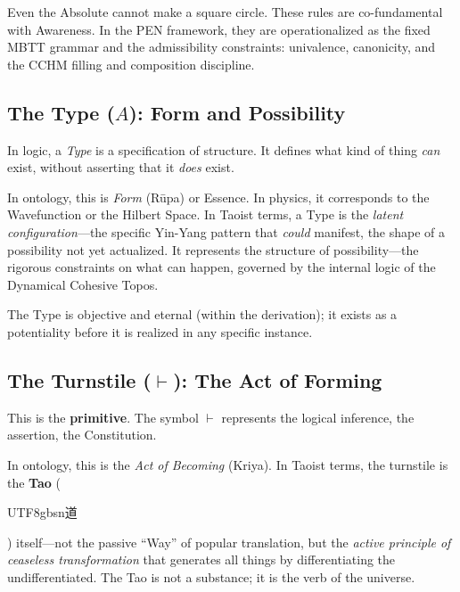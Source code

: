 \documentclass[12pt,a4paper]{article}
\newcommand{\turnstile}{\vdash}
\begin{document}
Even the Absolute cannot make a square circle. These rules are co-fundamental with Awareness. In the PEN framework, they are operationalized as the fixed MBTT grammar and the admissibility constraints: univalence, canonicity, and the CCHM filling and composition discipline.


\subsection{The Type ($A$): Form and Possibility}
\label{sec:type}

In logic, a \emph{Type} is a specification of structure. It defines what kind of thing \emph{can} exist, without asserting that it \emph{does} exist.

In ontology, this is \emph{Form} (R\=upa) or Essence. In physics, it corresponds to the Wavefunction or the Hilbert Space. In Taoist terms, a Type is the \emph{latent configuration}---the specific Yin-Yang pattern that \emph{could} manifest, the shape of a possibility not yet actualized. It represents the structure of possibility---the rigorous constraints on what can happen, governed by the internal logic of the Dynamical Cohesive Topos.

The Type is objective and eternal (within the derivation); it exists as a potentiality before it is realized in any specific instance.


\subsection{The Turnstile ($\turnstile$): The Act of Forming}
\label{sec:turnstile}

This is the \textbf{primitive}. The symbol $\turnstile$ represents the logical inference, the assertion, the Constitution.

In ontology, this is the \emph{Act of Becoming} (Kriya). In Taoist terms, the turnstile is the \textbf{Tao} (\begin{CJK}{UTF8}{gbsn}道\end{CJK}) itself---not the passive ``Way'' of popular translation, but the \emph{active principle of ceaseless transformation} that generates all things by differentiating the undifferentiated. The Tao is not a substance; it is the verb of the universe.
\end{document}
